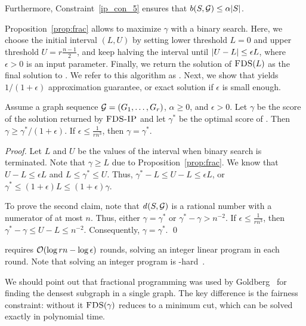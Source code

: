 Furthermore, Constraint~\ref{ip_con_5} ensures that $b(S, {\mathcal G}) \leq \alpha {\left|S\right|}$. %

Proposition~\ref{prop:frac} allows to maximize $\gamma$
with a binary search. Here, we choose the initial interval $(L, U)$ by setting lower threshold $L = 0$ and upper threshold $U = r\frac{n - 1}{2}$, and keep halving the interval until ${\left| U - L\right|} \leq  \epsilon L$, where $\epsilon > 0$  is an input parameter. Finally, we return the solution of $\textsc{FDS}(L)$ as the final solution to \problemcdcsm. We refer to this algorithm as \algipcm.
Next, we show that \algipcm yields $1/(1+\epsilon)$ approximation guarantee, or exact solution if $\epsilon$ is small enough.

\begin{proposition}
Assume a graph sequence ${\mathcal G} = (G_1,\dots,G_r)$, $\alpha \geq 0$, and $\epsilon > 0$. 
Let $\gamma$ be the score of the solution returned by $\textsc{FDS-IP}$ and let $\gamma^*$ be the optimal score of \problemcdcsm. Then $\gamma \geq \gamma^*/(1 + \epsilon)$. If $\epsilon \leq \frac{1}{rn^3}$, then $\gamma = \gamma^*$.
\label{prop:opt-ip-approx}
\end{proposition}

\begin{proof}
Let $L$ and $U$ be the values of the interval when binary search is terminated. Note that $\gamma \geq L$ due to Proposition~\ref{prop:frac}.
We know that $U - L \leq \epsilon L$ and $L \leq \gamma^* \leq U$. Thus,
$\gamma^* - L \leq U - L \leq \epsilon L$, or $\gamma^*  \leq (1 + \epsilon) L \leq (1 + \epsilon) \gamma$.

To prove the second claim, note that $\dens{S, \calG}$ is a rational number with a numerator of at most $n$. Thus, either $\gamma = \gamma^*$ or $\gamma^* - \gamma > n^{-2}$. If $\epsilon \leq \frac{1}{rn^3}$, then $\gamma^* - \gamma \leq U - L \leq n^{-2}$. Consequently, $\gamma = \gamma^*$.
\qed
\end{proof}


\algipcm requires $\bigO{\log rn - \log \epsilon}$ rounds, solving an integer linear program in each round. Note that solving an integer program is \np-hard~\cite{Schrijver1998}.

We should point out that fractional programming was used
by Goldberg~\cite{goldberg1984finding} for finding the densest subgraph in a single graph.
The key difference is the fairness constraint: without it $\textsc{FDS}(\gamma)$ reduces to a minimum cut, which can be solved exactly in polynomial time.

